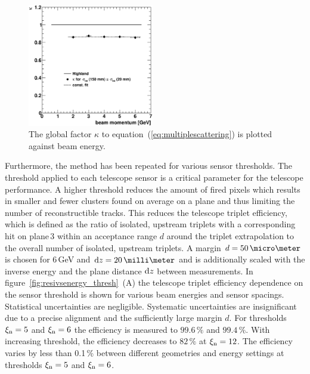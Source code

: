 \begin{figure}[t]
  \centering
  \includegraphics[width=0.49\textwidth]{figures/kappa}
  \caption[HL Factor]{
  The global factor $\kappa$ to equation~(\ref{eq:multiplescattering}) is plotted against beam energy.
  }
  \label{fig:HL_factor}
\end{figure}

Furthermore, the method has been repeated for various sensor thresholds.
The threshold applied to each telescope sensor is a critical parameter for the telescope performance.
A higher threshold reduces the amount of fired pixels which results in smaller and fewer clusters found on average on a plane and thus limiting the number of reconstructible tracks.
This reduces the telescope triplet efficiency, which is defined as the ratio of isolated, upstream triplets with a corresponding hit on plane\,3 within an acceptance range $d$
 around the triplet extrapolation to the overall number of isolated, upstream triplets.
A margin $d = 50\,\micro\meter$ is chosen for 6\,GeV and $\dz = 20\,\milli\meter$ and is additionally scaled with the inverse energy and the plane distance $\textrm{d}z$ between measurements. 
In figure~\ref{fig:resivsenergy_thresh}~(A) the telescope triplet efficiency dependence on the sensor threshold is shown for various beam energies and sensor spacings.
Statistical uncertainties are negligible.
Systematic uncertainties are insignificant due to a precise alignment and the sufficiently large margin $d$.  
For thresholds $\xi_{\textrm{n}} = 5$ and $\xi_{\textrm{n}} = 6$ the efficiency is measured to $99.6\,\%$ and $99.4\,\%$.
With increasing threshold, the efficiency decreases to $82\,\%$ at $\xi_{\textrm{n}} = 12$. 
The efficiency varies by less than 0.1\,\% between different geometries and energy settings at thresholds $\xi_{\textrm{n}} = 5$ and $\xi_{\textrm{n}} = 6$. 

